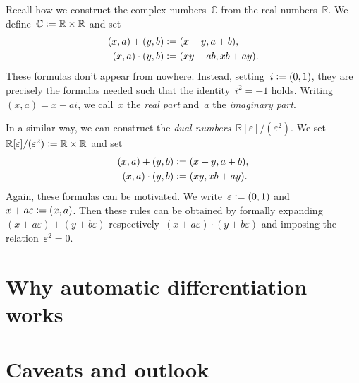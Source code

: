 \documentclass[a4paper,ngerman,12pt]{scrartcl}
\theoremstyle{definition}
\theoremstyle{plain}
\theoremstyle{remark}
\newcommand{\RR}{\mathbb{R}}
\newcommand{\CC}{\mathbb{C}}
\newcommand{\defeq}{\vcentcolon=}
\begin{document}
Recall how we construct the complex numbers~$\CC$ from the real numbers~$\RR$.
We define~$\CC \defeq \RR \times \RR$ and set
\begin{align*}
  (x,a) + (y,b) &\defeq (x+y, a+b), \\
  (x,a) \cdot (y,b) &\defeq (xy - ab, xb+ay).
\end{align*}
These formulas don't appear from nowhere. Instead, setting~$i \defeq (0,1)$,
they are precisely the formulas needed such that the identity~$i^2 = -1$
holds. Writing~$(x,a) = x + ai$, we call~$x$ the \emph{real part} and~$a$ the
\emph{imaginary part}.

In a similar way, we can construct the \emph{dual
numbers}~$\RR[\varepsilon]/(\varepsilon^2)$. We
set~$\RR[\varepsilon]/(\varepsilon^2) \defeq \RR \times \RR$ and set
\begin{align*}
  (x,a) + (y,b) &\defeq (x+y, a+b), \\
  (x,a) \cdot (y,b) &\defeq (xy, xb+ay).
\end{align*}
Again, these formulas can be motivated. We write~$\varepsilon \defeq (0,1)$
and~$x + a \varepsilon \defeq (x,a)$. Then these rules can be obtained by
formally expanding~$(x + a \varepsilon) + (y + b \varepsilon)$ respectively~$(x
+ a \varepsilon) \cdot (y + b \varepsilon)$ and imposing the
relation~$\varepsilon^2 = 0$.



\section{Why automatic differentiation works}


\section{Caveats and outlook}

\end{document}
